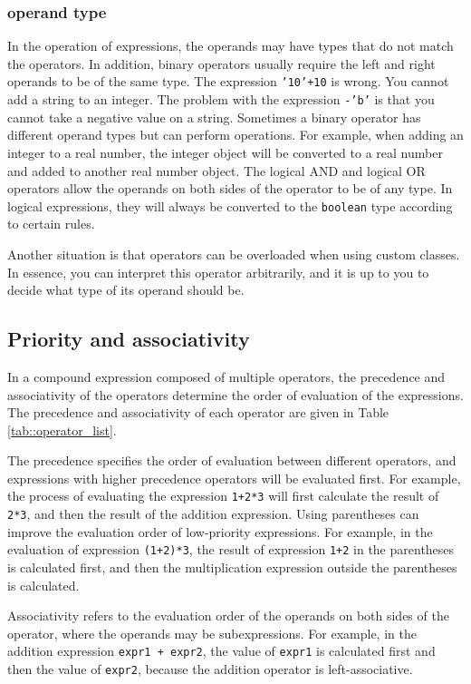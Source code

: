 \subsubsection {operand type}

In the operation of expressions, the operands may have types that do not match the operators. In addition, binary operators usually require the left and right operands to be of the same type. The expression \texttt{'10'+10} is wrong. You cannot add a string to an integer. The problem with the expression \texttt{-'b'} is that you cannot take a negative value on a string. Sometimes a binary operator has different operand types but can perform operations. For example, when adding an integer to a real number, the integer object will be converted to a real number and added to another real number object. The logical AND and logical OR operators allow the operands on both sides of the operator to be of any type. In logical expressions, they will always be converted to the \texttt{boolean} type according to certain rules.

Another situation is that operators can be overloaded when using custom classes. In essence, you can interpret this operator arbitrarily, and it is up to you to decide what type of its operand should be.

\subsection {Priority and associativity}

In a compound expression composed of multiple operators, the precedence and associativity of the operators determine the order of evaluation of the expressions. The precedence and associativity of each operator are given in Table \ref{tab::operator_list}.

The precedence specifies the order of evaluation between different operators, and expressions with higher precedence operators will be evaluated first. For example, the process of evaluating the expression \texttt{1+2*3} will first calculate the result of \texttt{2*3}, and then the result of the addition expression. Using parentheses can improve the evaluation order of low-priority expressions. For example, in the evaluation of expression \texttt{(1+2)*3}, the result of expression \texttt{1+2} in the parentheses is calculated first, and then the multiplication expression outside the parentheses is calculated.

Associativity refers to the evaluation order of the operands on both sides of the operator, where the operands may be subexpressions. For example, in the addition expression \texttt{expr1 + expr2}, the value of \texttt{expr1} is calculated first and then the value of \texttt{expr2}, because the addition operator is left-associative.

